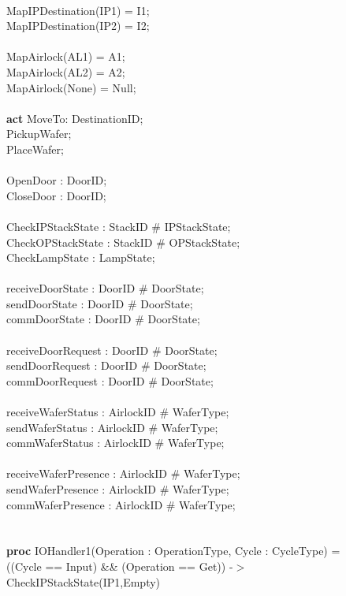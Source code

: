 \documentclass[a4paper,12pt]{article}
\begin{document}
	\\		MapIPDestination(IP1) = I1;
	\\		MapIPDestination(IP2) = I2;
	\\
	\\		MapAirlock(AL1) = A1;
	\\		MapAirlock(AL2) = A2;
	\\		MapAirlock(None) = Null;
	\\
	\\\textbf{act} MoveTo: DestinationID;
	\\	  PickupWafer;
	\\	  PlaceWafer;
	\\
	\\	    OpenDoor : DoorID;
	\\		CloseDoor : DoorID;
	\\
	\\	  CheckIPStackState : StackID \# IPStackState;
	\\	  CheckOPStackState : StackID \# OPStackState;
	\\		CheckLampState : LampState;
	\\
	\\	  receiveDoorState : DoorID \# DoorState;
	\\	  sendDoorState : DoorID \# DoorState;
	\\		commDoorState : DoorID \# DoorState;
	\\
	\\	  receiveDoorRequest : DoorID \# DoorState;
	\\		sendDoorRequest : DoorID \# DoorState;
	\\		commDoorRequest : DoorID \# DoorState;
	\\
	\\	  receiveWaferStatus : AirlockID \# WaferType;
	\\		sendWaferStatus : AirlockID \# WaferType;
	\\		commWaferStatus : AirlockID \# WaferType;
	\\
	\\	  receiveWaferPresence : AirlockID \# WaferType;
	\\		sendWaferPresence : AirlockID \# WaferType;
	\\		commWaferPresence : AirlockID \# WaferType;
	\\
	\\
	\\\textbf{proc} IOHandler1(Operation : OperationType, Cycle : CycleType) = 
	\\((Cycle == Input) \&\& (Operation == Get)) -$>$ CheckIPStackState(IP1,Empty)
\end{document}
